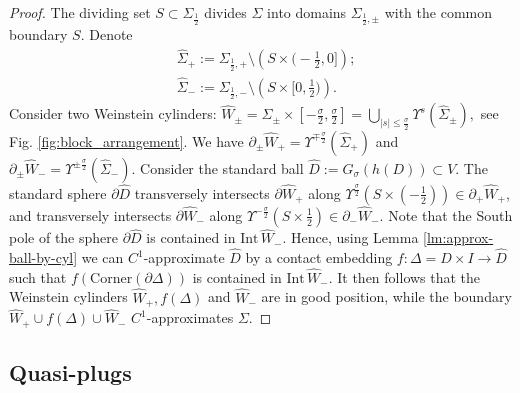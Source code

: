 \documentclass[12pt]{amsart}
\theoremstyle{plain}
\theoremstyle{definition}
\theoremstyle{remark}
\newcommand{\p}{\partial}
\newcommand{\wh}{\widehat}
\newcommand{\Int}{\mathrm{Int\,}}
\newcommand{\corner}{\mathrm{Corner}}
\begin{document}
\begin{proof}
The dividing set $S\subset \Sigma_{\frac12}$ divides  $\Sigma$ into  domains $\Sigma_{\frac12,\pm}$ with the common boundary $S$. Denote
\begin{align*}
&\wh\Sigma_+:=\Sigma_{\frac12,+}\setminus \left(S\times\big(-\frac12,0\big]\right);\\
&\wh\Sigma_-:=\Sigma_{\frac12,-}\setminus \left(S\times\big[0,\frac12\big)\right).
\end{align*}
Consider two  Weinstein cylinders: $\wh W_\pm=\wh\Sigma_\pm\times[-\frac\sigma2,\frac\sigma2]=\bigcup\limits_{|s|\leq\frac\sigma2}\Upsilon^s(\wh\Sigma_\pm),$  see Fig. \ref{fig:block_arrangement}. We have
$\p_\pm \wh W_+=\Upsilon^{\mp\frac\sigma2}(\wh\Sigma_+)$ and
$\p_\pm \wh W_-=\Upsilon^{\pm\frac\sigma2}(\wh\Sigma_-)$. 
Consider the standard ball $\wh D:=G_\sigma(h(D))\subset V$.  The standard sphere $\p\wh D$ transversely intersects $\p \wh W_+$ along $\Upsilon^{\frac\sigma2}(S\times(-\frac12))\in\p_+\wh W_+$, and 
transversely intersects $\p \wh W_-$  along $\Upsilon^{-\frac\sigma2}(S\times\frac12)\in\p_-\wh W_-$. Note that the South pole of the sphere $\p \wh D$ is contained in $\Int\wh W_-$. Hence, using Lemma \ref{lm:approx-ball-by-cyl} we can  $C^1$-approximate   $\wh D$ by a contact embedding   $f:\Delta=D\times I\to \wh D$ such that $f(\corner(\p\Delta))$ is contained in $\Int\wh W_-$. It then follows that the Weinstein cylinders $\wh W_+,f(\Delta)$ and $\wh W_-$ are in good position, while the  boundary  $\wh W_+\cup f(\Delta)\cup\wh W_-$ \;$C^1$-approximates $\Sigma$.
    \end{proof}
 
     \subsection{Quasi-plugs}\label{sec:quasi-plug}
     

     
  

        



     
     
\end{document}

